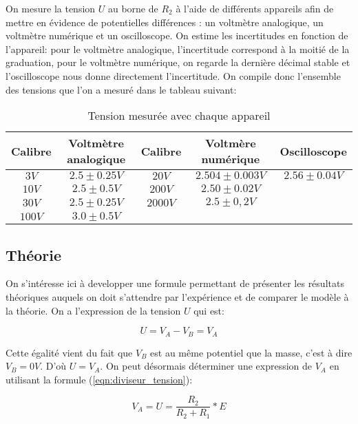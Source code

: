 \documentclass[10pt]{article}
\begin{document}
On mesure la tension $U$ au borne de $R_{2}$ à l'aide de différents appareils afin de mettre en évidence de potentielles différences
: un voltmètre analogique, un voltmètre numérique et un oscilloscope. On estime les incertitudes en fonction de l'appareil: pour le voltmètre analogique, 
l'incertitude correspond à la moitié de la graduation, pour le voltmètre numérique, on regarde la dernière décimal stable et l'oscilloscope nous donne directement l'incertitude. 
On compile donc l'ensemble des tensions que l'on a mesuré dans le tableau suivant:

\begin{table}[h!]
    \begin{center}
        \begin{tabular}{|c|c||c|c||c|}
            \hline
            Calibre & Voltmètre analogique & Calibre & Voltmère numérique & Oscilloscope \\
            \hline
            $3V$ & $2.5 \pm 0.25V$ & $20V$ & $2.504 \pm 0.003V$ & $2.56 \pm 0.04V$ \\
            $10V$ & $2.5 \pm 0.5V$ & $200V$ & $2.50 \pm 0.02V$ &  \\
            $30V$ & $2.5 \pm 0.25V$ & $2000V$ & $2.5 \pm 0,2V$ &  \\
            $100V$ & $3.0 \pm 0.5V$ & & & \\
            \hline
        \end{tabular}
        \caption{Tension mesurée avec chaque appareil}
        \label{table:table1}
    \end{center}
\end{table}

\subsection{Théorie}
On s'intéresse ici à developper une formule permettant de présenter les résultats théoriques auquels on doit s'attendre par l'expérience
et de comparer le modèle à la théorie. On a l'expression de la tension $U$ qui est:

\begin{equation}
    U = V_A - V_B = V_A
\end{equation}

Cette égalité vient du fait que $V_B$ est au même potentiel que la masse, c'est à dire $V_B = 0V$. D'où $U = V_A$. On peut
désormais déterminer une expression de $V_A$ en utilisant la formule (\ref{eqn:diviseur_tension}):

\begin{equation}
    V_A = U = \frac{R_2}{R_2 + R_1} * E
\end{equation}
\end{document}

